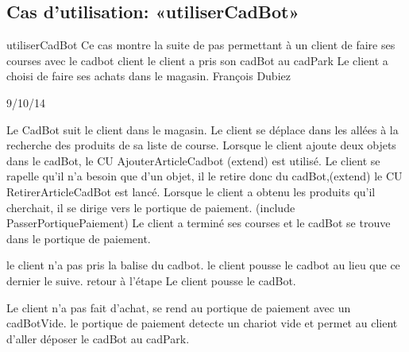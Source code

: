 \subsection{Cas d'utilisation: «utiliserCadBot» }

\startCU
\nom utiliserCadBot
\but Ce cas montre la suite de pas permettant à un client de faire ses courses avec le cadbot
\acteur client
\precondition le client a pris son cadBot au cadPark
\declenchement Le client a choisi de faire ses achats dans le magasin.
\auteur François Dubiez
\date 29/10/14

\nominal %
\startnominal
\etape[SA1] Le CadBot suit le client dans le magasin. 
\etape[RETOUR] Le client se déplace dans les allées à la recherche des produits de sa liste de course.
\etape Lorsque le client ajoute deux objets dans le cadBot, le CU AjouterArticleCadbot (extend) est utilisé.
\etape Le client se rapelle qu'il n'a besoin que d'un objet, il le retire donc du cadBot,(extend) le CU RetirerArticleCadBot est lancé.
\etape Lorsque le client a obtenu les produits qu'il cherchait, il se dirige vers le portique de paiement. (include PasserPortiquePaiement)
\stopnominal
\postcondition Le client a terminé ses courses et le cadBot se trouve dans le portique de paiement.

\alternatifs %
\startalternatif[SA1] %
\startcondition[ModeManuel] 
  \etape le client n'a pas pris la balise du cadbot.
  \etape le client pousse le cadbot au lieu que ce dernier le suive.
  \etape retour à l'étape \in[RETOUR]
\stopcondition
\postcondition Le client pousse le cadBot.
\stopalternatif


\exception %
Le client n'a pas fait d'achat, se rend au portique de paiement avec un cadBotVide.
le portique de paiement detecte un chariot vide et permet au client d'aller déposer le cadBot au cadPark.
\stopCU
